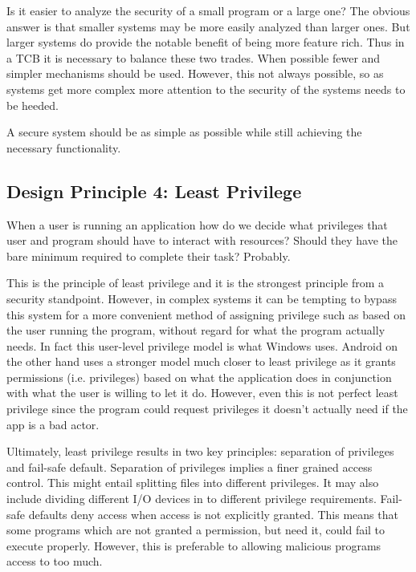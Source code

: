     Is it easier to analyze the security of a small program or a large one?
    The obvious answer is that smaller systems may be more easily analyzed than larger ones.
    But larger systems do provide the notable benefit of being more feature rich.
    Thus in a TCB it is necessary to balance these two trades.
    When possible fewer and simpler mechanisms should be used.
    However, this not always possible, so as systems get more complex more attention to 
      the security of the systems needs to be heeded.
    
    \begin{keybox}
      A secure system should be as simple as possible while still achieving the
        necessary functionality.
    \end{keybox}

  \subsection{Design Principle 4: Least Privilege}
  \label{ssec:design_principle_4_least_privilege}

    When a user is running an application how do we decide what privileges that user and program 
      should have to interact with resources?
    Should they have the bare minimum required to complete their task?
    Probably.

    This is the principle of least privilege and it is the strongest principle from a security standpoint.
    However, in complex systems it can be tempting to bypass this system for a more convenient method of
      assigning privilege such as based on the user running the program, without regard for what the program
      actually needs.
    In fact this user-level privilege model is what Windows uses.
    Android on the other hand uses a stronger model much closer to least privilege as it grants permissions
      (i.e. privileges) based on what the application does in conjunction with what the user is willing to 
      let it do.
    However, even this is not perfect least privilege since the program could request privileges it doesn't
      actually need if the app is a bad actor.

    Ultimately, least privilege results in two key principles: separation of privileges and fail-safe default.
    Separation of privileges implies a finer grained access control.
    This might entail splitting files into different privileges.
    It may also include dividing different I/O devices in to different privilege requirements.
    Fail-safe defaults deny access when access is not explicitly granted.
    This means that some programs which are not granted a permission, but need it, could fail to execute properly.
    However, this is preferable to allowing malicious programs access to too much.

